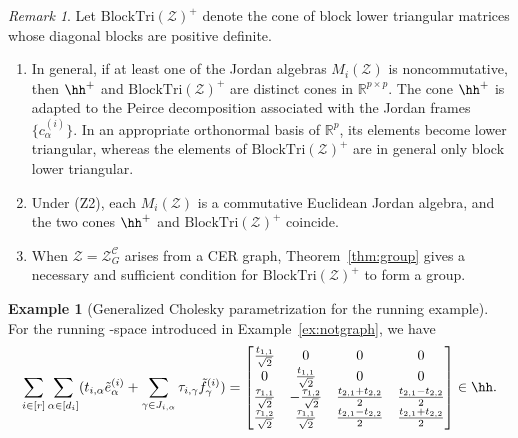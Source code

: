 \documentclass[12pt]{amsart}
\theoremstyle{plain}
\theoremstyle{definition}
\newtheorem{example}[theorem]{Example}
\theoremstyle{remark}
\newtheorem{remark}[theorem]{Remark}
\newcommand{\1}{\mathbf{1}}
\newcommand{\tri}{\mathrm{BlockTri}}
\begin{document}
\begin{remark}\label{rem:Tri+}
Let \(\tri(\mathcal{Z})^{+}\) denote the cone of block lower triangular
matrices whose diagonal blocks are positive definite.
\begin{enumerate}
\item[(i)]
In general, if at least one of the Jordan algebras \(M_i(\mathcal Z)\)
is noncommutative, then \(\hh^+\) and \(\tri(\mathcal Z)^+\) are
distinct cones in \(\mathbb R^{p\times p}\). The cone \(\hh^+\) is
adapted to the Peirce decomposition associated with the Jordan frames
\(\{c_\alpha^{(i)}\}\). In an appropriate orthonormal basis of
\(\mathbb R^p\), its elements become lower triangular, whereas the
elements of \(\tri(\mathcal Z)^+\) are in general only block lower
triangular.

\item[(ii)]
Under (Z2), each \(M_i(\mathcal Z)\) is a commutative Euclidean Jordan
algebra, and the two cones \(\hh^+\) and \(\tri(\mathcal Z)^+\) coincide.

\item[(iii)]
When \(\mathcal Z=\mathcal Z_G^{\mathcal C}\) arises from a CER graph,
Theorem~\ref{thm:group} gives a necessary and sufficient condition for
\(\tri(\mathcal Z)^+\) to form a group.
\end{enumerate}
\end{remark}

\begin{example}[Generalized Cholesky parametrization for the running example]\label{ex:notgraph-cholesky}
For the running \cBC-space introduced in Example~\ref{ex:notgraph}, we have
\[
    \sum_{i\in[r]} \sum_{\alpha\in[d_i]} (t_{i,\alpha} \tilde{e}^{(i)}_\alpha + \sum_{\gamma \in J_{i,\alpha}} \tau_{i,\gamma} \tilde{f}^{(i)}_\gamma )=\begin{bmatrix}
        \frac{t_{1,1}}{\sqrt{2}} & 0 & 0 & 0 \\
        0 & \frac{t_{1,1}}{\sqrt{2}} & 0 & 0 \\
        \frac{\tau_{1,1}}{\sqrt{2}} & - \frac{\tau_{1,2}}{\sqrt{2}} & \frac{t_{2,1}+t_{2,2}}{2} &\frac{t_{2,1}-t_{2,2}}{2} \\
     \frac{\tau_{1,2}}{\sqrt{2}} & \frac{\tau_{1,1}}{\sqrt{2}} & \frac{t_{2,1}-t_{2,2}}{2} &\frac{t_{2,1}+t_{2,2}}{2} 
    \end{bmatrix}\in\hh.
\]
\end{example}
\end{document}
